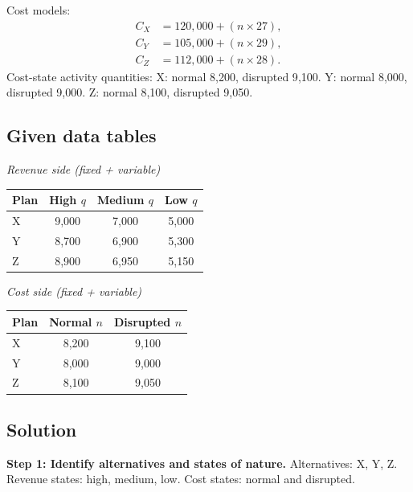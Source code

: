 \begin{ExamProblems}
		Cost models:
		\[
		\begin{aligned}
		C_X &= 120{,}000 + (n\times27),\\
		C_Y &= 105{,}000 + (n\times29),\\
		C_Z &= 112{,}000 + (n\times28).
		\end{aligned}
		\]
		Cost-state activity quantities:
		X: normal 8{,}200, disrupted 9{,}100.
		Y: normal 8{,}000, disrupted 9{,}000.
		Z: normal 8{,}100, disrupted 9{,}050.
		
		\subsection*{Given data tables}
		\begin{center}
			\begin{minipage}[t]{0.48\linewidth}
				\textit{Revenue side (fixed + variable)}
				\begin{center}
					\begin{tabular}{l c c c}
						\toprule
						Plan & High $q$ & Medium $q$ & Low $q$ \\
						\midrule
						X & 9{,}000 & 7{,}000 & 5{,}000 \\
						Y & 8{,}700 & 6{,}900 & 5{,}300 \\
						Z & 8{,}900 & 6{,}950 & 5{,}150 \\
						\bottomrule
					\end{tabular}
				\end{center}
			\end{minipage}
			\hfill
			\begin{minipage}[t]{0.48\linewidth}
				\textit{Cost side (fixed + variable)}
				\begin{center}
					\begin{tabular}{l c c}
						\toprule
						Plan & Normal $n$ & Disrupted $n$ \\
						\midrule
						X & 8{,}200 & 9{,}100 \\
						Y & 8{,}000 & 9{,}000 \\
						Z & 8{,}100 & 9{,}050 \\
						\bottomrule
					\end{tabular}
				\end{center}
			\end{minipage}
		\end{center}
		
		\subsection*{Solution}
		\textbf{Step 1: Identify alternatives and states of nature.} Alternatives: X, Y, Z. Revenue states: high, medium, low. Cost states: normal and disrupted.
		

\end{ExamProblems}
